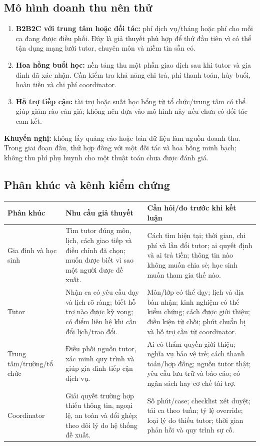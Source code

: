 \documentclass[11pt,a4paper]{article}
\begin{document}
\subsection{Mô hình doanh thu nên thử}

\begin{enumerate}
  \item \textbf{B2B2C với trung tâm hoặc đối tác:} phí dịch vụ/tháng hoặc phí
  cho mỗi ca đang được điều phối. Đây là giả thuyết phù hợp để thử đầu tiên
  vì có thể tận dụng mạng lưới tutor, chuyên môn và niềm tin sẵn có.
  \item \textbf{Hoa hồng buổi học:} nền tảng thu một phần giao dịch sau khi
  tutor và gia đình đã xác nhận. Cần kiểm tra khả năng chi trả, phí thanh toán,
  hủy buổi, hoàn tiền và chi phí coordinator.
  \item \textbf{Hỗ trợ tiếp cận:} tài trợ hoặc suất học bổng từ tổ chức/trung
  tâm có thể giúp giảm rào cản giá; không nên dựa vào mô hình này nếu chưa có
  đối tác cam kết.
\end{enumerate}

\textbf{Khuyến nghị:} không lấy quảng cáo hoặc bán dữ liệu làm nguồn doanh thu.
Trong giai đoạn đầu, thử hợp đồng với một đối tác và hoa hồng minh bạch; không
thu phí phụ huynh cho một thuật toán chưa được đánh giá.

\subsection{Phân khúc và kênh kiểm chứng}

\begin{tabularx}{\textwidth}{p{2.8cm}p{5.5cm}Y}
\toprule
\textbf{Phân khúc} & \textbf{Nhu cầu giả thuyết} &
\textbf{Cần hỏi/đo trước khi kết luận} \\
\midrule
Gia đình và học sinh & Tìm tutor đúng môn, lịch, cách giao tiếp và điều chỉnh
đã chọn; muốn được biết vì sao một người được đề xuất. &
Cách tìm hiện tại; thời gian, chi phí và lần đổi tutor; ai quyết định và ai
trả tiền; thông tin nào không muốn chia sẻ; học sinh muốn tham gia thế nào. \\
Tutor & Nhận ca có yêu cầu dạy và lịch rõ ràng; biết hỗ trợ nào được kỳ vọng;
có điểm liên hệ khi cần đổi lịch/trao đổi. &
Môn/lớp có thể dạy; lịch và địa bàn nhận; kinh nghiệm có thể kiểm chứng; cách
được giới thiệu; điều kiện từ chối; phút chuẩn bị và hỗ trợ cần từ coordinator. \\
Trung tâm/trường/tổ chức & Điều phối nguồn tutor, xác minh quy trình và giúp
gia đình tiếp cận dịch vụ. &
Ai có thẩm quyền giới thiệu; nghĩa vụ bảo vệ trẻ; cách thanh toán/hợp đồng;
nguồn tutor thật; yêu cầu lưu trữ và báo cáo; có ngân sách hay cơ chế tài trợ. \\
Coordinator & Giải quyết trường hợp thiếu thông tin, ngoại lệ, an toàn và
đổi ghép; theo dõi lý do hệ thống đề xuất. &
Số phút/case; checklist xét duyệt; tải ca theo tuần; tỷ lệ override; loại lý
do thiếu tutor; thời gian phản hồi và quy trình sự cố. \\
\bottomrule
\end{tabularx}
\end{document}
